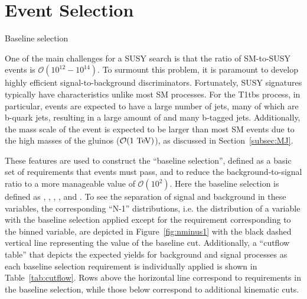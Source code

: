 \chapter{Event Selection}

\begin{section}{Baseline selection}

One of the main challenges for a SUSY search is that the ratio of SM-to-SUSY events is $\mathcal{O}(10^{12} - 10^{14})$.
To surmount this problem, it is paramount to develop highly efficient signal-to-background discriminators.
Fortunately, SUSY signatures typically have characteristics unlike most SM processes.
For the T1tbs process, in particular, events are expected to have a large number of jets, many of which are b-quark jets, resulting in a large amount of \HT and many b-tagged jets.
Additionally, the mass scale of the event is expected to be larger than most SM events due to the high masses of the gluinos ($\mathcal{O}(1~\mathrm{Te\kern -0.1em V})$), as discussed in Section~\ref{subsec:MJ}.

These features are used to construct the ``baseline selection'', defined as a basic set of requirements that events must pass, and to reduce the background-to-signal ratio to a more manageable value of $\mathcal{O}(10^2)$.
Here the baseline selection is defined as \baseNleps, \baseHT, \baseMJ, \baseNjets, and \baseNb.
To see the separation of signal and background in these variables, the corresponding ``N-1'' distributions, i.e. the distribution of a variable with the baseline selection applied except for the requirement corresponding to the binned variable, are depicted in Figure~\ref{fig:nminus1} with the black dashed vertical line representing the value of the baseline cut.
Additionally, a ``cutflow table'' that depicts the expected yields for background and signal processes as each baseline selection requirement is individually applied is shown in Table~\ref{tab:cutflow}.
Rows above the horizontal line correspond to requirements in the baseline selection, while those below correspond to additional kinematic cuts.


\end{section}
